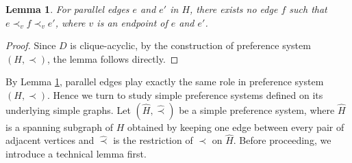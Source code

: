 \documentclass[11pt]{article}
\newtheorem{lemma}[theorem]{Lemma}
\numberwithin{theorem}{section}
\begin{document}
\begin{lemma}
\label{lem:reduct1}
For parallel edges $e$ and $e'$ in $H$, there exists no edge $f$ such that $e\prec_v f \prec_v e'$, where $v$ is an endpoint of $e$ and $e'$.
\end{lemma}
\begin{proof}
Since $D$ is clique-acyclic, by the construction of preference system $(H,\prec)$, the lemma follows directly.
\end{proof}

By Lemma \ref{lem:reduct1}, parallel edges play exactly the same role in preference system $(H,\prec)$. Hence we turn to study simple preference systems defined on its underlying simple graphs. Let $(\hat{H},\hat\prec)$ be a simple preference system, where $\hat{H}$ is a spanning subgraph of $H$ obtained by keeping one edge between every pair of adjacent vertices and $\hat\prec$ is the restriction of $\prec$ on $\hat{H}$. Before proceeding, we introduce a technical lemma first.
\end{document}
